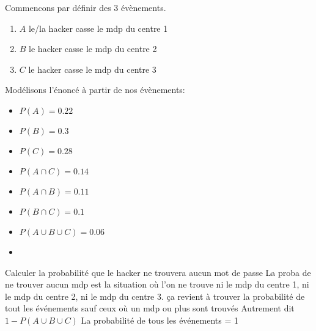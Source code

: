 \begin{exo}

    Commencons par définir des 3 évènements.
    \begin{enumerate}
        \item $A$ le/la hacker casse le mdp du centre 1
        \item $B$ le hacker casse le mdp du centre 2
        \item $C$  le hacker casse le mdp du centre 3
    \end{enumerate}
    Modélisons l'énoncé à partir de nos évènements:
    \begin{multicols}{2}
        \begin{itemize}
            \item $P(A) = 0.22$
            \item $P(B) = 0.3$
            \item $P(C) = 0.28$
            \item $P(A \cap C) = 0.14$  
            \item $P(A \cap B) = 0.11$ 
            \item $P(B \cap C) = 0.1$ 
            \item $P(A\cup B \cup C) = 0.06$
            \item[\vspace{\fill}]
        \end{itemize}
    \end{multicols}
    \begin{subexo}{Calculer la probabilité que le hacker ne trouvera aucun mot de passe}
        La proba de ne trouver aucun mdp est la situation où l'on ne trouve ni le mdp du centre 1, ni le mdp du centre 2, ni le mdp du centre 3.
        ça revient à trouver la probabilité de tout les événements sauf ceux où un mdp ou plus sont trouvés Autrement dit $1 - P(A\cup B \cup C)$ 
        \newline
        La probabilité de tous les événements = 1\newline

\end{subexo}
\end{exo}
